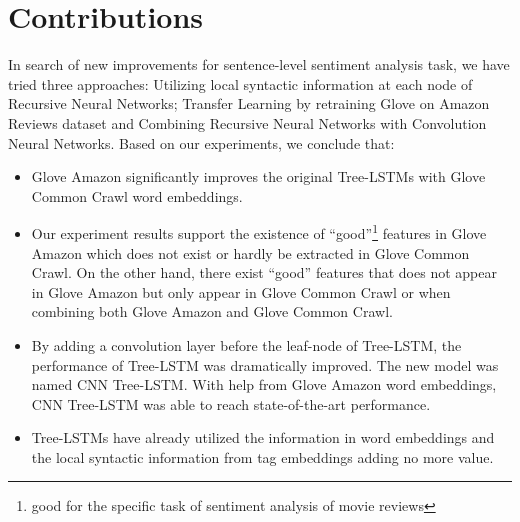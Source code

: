 \section{Contributions}
In search of new improvements for sentence-level sentiment analysis task, we have tried three approaches: Utilizing local syntactic information at each node of Recursive Neural Networks; Transfer Learning by retraining Glove on Amazon Reviews dataset and Combining Recursive Neural Networks with Convolution Neural Networks.
Based on our experiments, we conclude that:
\begin{itemize}
\item Glove Amazon significantly improves the original Tree-LSTMs with Glove Common Crawl word embeddings.

\item Our experiment results support the existence of ``good''\footnote{good for the specific task of sentiment analysis of movie reviews} features in Glove Amazon which does not exist or hardly be extracted in Glove Common Crawl.
On the other hand, there exist ``good'' features that does not appear in Glove Amazon but only appear in Glove Common Crawl or when combining both Glove Amazon and Glove Common Crawl.

\item By adding a convolution layer before the leaf-node of Tree-LSTM, the performance of Tree-LSTM was dramatically improved.
The new model was named CNN Tree-LSTM.
With help from Glove Amazon word embeddings, CNN Tree-LSTM was able to reach state-of-the-art performance.

\item  Tree-LSTMs have already utilized the information in word embeddings and the local syntactic information from tag embeddings adding no more value.
\end{itemize}

